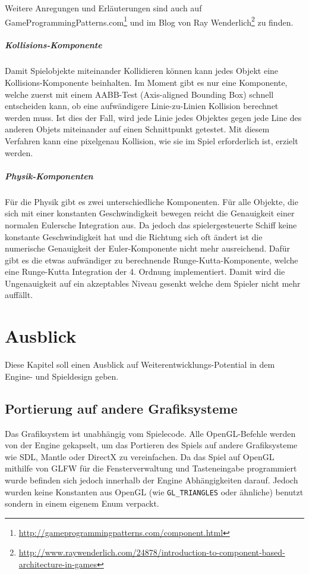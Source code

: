 \documentclass[12pt, a4paper, titlepage, hidelinks]{scrreprt}
\begin{document}
Weitere Anregungen und Erläuterungen sind auch auf GameProgrammingPatterns.com\footnote{\url{http://gameprogrammingpatterns.com/component.html}} und im Blog von Ray Wenderlich\footnote{\url{http://www.raywenderlich.com/24878/introduction-to-component-based-architecture-in-games}} zu finden.

\paragraph{Kollisions-Komponente}
Damit Spielobjekte miteinander Kollidieren können kann jedes Objekt eine Kollisions-Komponente beinhalten. Im Moment gibt es nur eine Komponente, welche zuerst mit einem AABB-Test (Axis-aligned Bounding Box) schnell entscheiden kann, ob eine aufwändigere Linie-zu-Linien Kollision berechnet werden muss. Ist dies der Fall, wird jede Linie jedes Objektes gegen jede Line des anderen Objets miteinander auf einen Schnittpunkt getestet. Mit diesem Verfahren kann eine pixelgenau Kollision, wie sie im Spiel erforderlich ist, erzielt werden.

\paragraph{Physik-Komponenten}
Für die Physik gibt es zwei unterschiedliche Komponenten. Für alle Objekte, die sich mit einer konstanten Geschwindigkeit bewegen reicht die Genauigkeit einer normalen Eulersche Integration aus. Da jedoch das spielergesteuerte Schiff keine konstante Geschwindigkeit hat und die Richtung sich oft ändert ist die numerische Genauigkeit der Euler-Komponente nicht mehr ausreichend. Dafür gibt es die etwas aufwändiger zu berechnende Runge-Kutta-Komponente, welche eine Runge-Kutta Integration der 4. Ordnung implementiert. Damit wird die Ungenauigkeit auf ein akzeptables Niveau gesenkt welche dem Spieler nicht mehr auffällt.

\chapter{Ausblick}

Diese Kapitel soll einen Ausblick auf Weiterentwicklungs-Potential in dem Engine- und Spieldesign geben.

\section{Portierung auf andere Grafiksysteme}

Das Grafiksystem ist unabhängig vom Spielecode. Alle OpenGL-Befehle werden von der Engine gekapselt, um das Portieren des Spiels auf andere Grafiksysteme wie SDL, Mantle oder DirectX zu vereinfachen. Da das Spiel auf OpenGL mithilfe von GLFW für die Fensterverwaltung und Tasteneingabe programmiert wurde befinden sich jedoch innerhalb der Engine Abhängigkeiten darauf. Jedoch wurden keine Konstanten aus OpenGL (wie \texttt{GL\_TRIANGLES} oder ähnliche) benutzt sondern in einem eigenem Enum verpackt.
\end{document}
